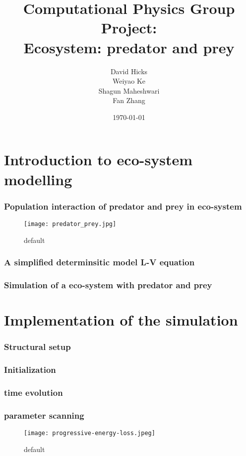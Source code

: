 \documentclass{beamer}
\title{Computational Physics Group Project: \\ Ecosystem: predator and prey}
\author{David Hicks\\ Weiyao Ke \\ Shagun Maheshwari \\ Fan Zhang}
\date{\today}
\begin{document}
\frame{\titlepage}

\section[Outline]{}
\frame{\tableofcontents}

\section{Introduction to eco-system modelling}
\frame
{
  \frametitle{Population interaction of predator and prey in eco-system}
\begin{figure}[htbp]
\begin{center}
\texttt{[image: predator\_prey.jpg]}
\caption{default}
\label{default}
\end{center}
\end{figure}

  
}
\frame
{
  \frametitle{A simplified determinsitic model L-V equation}
  
}
\frame
{
  \frametitle{Simulation of a eco-system with predator and prey}
  
}

\section{Implementation of the simulation}
\frame
{
  \frametitle{Structural setup}
  
}

\frame
{
  \frametitle{Initialization}
  
}

\frame
{
  \frametitle{time evolution}
  
}

\frame
{
  \frametitle{parameter scanning}
\begin{figure}[htbp]
\begin{center}
\texttt{[image: progressive-energy-loss.jpeg]}
\caption{default}
\label{default}
\end{center}
\end{figure}

  
}
\end{document}
